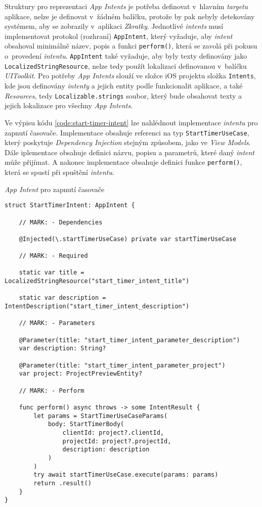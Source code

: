 Struktury pro reprezentaci \emph{App Intents} je potřeba definovat v~hlavním \emph{targetu} aplikace, nelze je definovat v~žádném balíčku, protože by pak nebyly detekovány systémem, aby se zobrazily v~aplikaci \emph{Zkratky}. Jednotlivé \emph{intents} musí implementovat protokol (rozhraní) \texttt{AppIntent}, který vyžaduje, aby \emph{intent} obsahoval minimálně název, popis a funkci \texttt{perform()}, která se zavolá při pokusu o~provedení \emph{intentu}. \texttt{AppIntent} také vyžaduje, aby byly texty definovány jako \texttt{LocalizedStringResource}, nelze tedy použít lokalizaci definovanou v~balíčku \emph{UIToolkit}. Pro potřeby \emph{App Intents} slouží ve složce iOS projektu složka \texttt{Intents}, kde jsou definovány \emph{intenty} a jejich entity podle funkcionalit aplikace, a také \emph{Resources}, tedy \texttt{Localizable.strings} soubor, který bude obsahovat texty a jejich lokalizace pro všechny \emph{App Intents}.

Ve výpisu kódu \ref{code:start-timer-intent} lze nahlédnout implementace \emph{intentu} pro zapnutí časovače. Implementace obsahuje referenci na typ \texttt{StartTimerUseCase}, který poskytuje \emph{Dependency Injection} stejným způsobem, jako ve \emph{View Models}. Dále iplementace obsahuje definici názvu, popisu a parametrů, které daný \emph{intent} může přijímat. A nakonec implementace obsahuje definici funkce \texttt{perform()}, která se spustí při spuštění \emph{intentu}.

\begin{listing}
\caption{\emph{App Intent} pro zapnutí časovače}\label{code:start-timer-intent}
\begin{verbatim}
struct StartTimerIntent: AppIntent {
    
    // MARK: - Dependencies
    
    @Injected(\.startTimerUseCase) private var startTimerUseCase
    
    // MARK: - Required
    
    static var title = LocalizedStringResource("start_timer_intent_title")
    
    static var description = IntentDescription("start_timer_intent_description")
    
    // MARK: - Parameters
    
    @Parameter(title: "start_timer_intent_parameter_description")
    var description: String?
    
    @Parameter(title: "start_timer_intent_parameter_project")
    var project: ProjectPreviewEntity?
    
    // MARK: - Perform
    
    func perform() async throws -> some IntentResult {
        let params = StartTimerUseCaseParams(
            body: StartTimerBody(
                clientId: project?.clientId,
                projectId: project?.projectId,
                description: description
            )
        )
        try await startTimerUseCase.execute(params: params)
        return .result()
    }
}       
\end{verbatim}
\end{listing}

